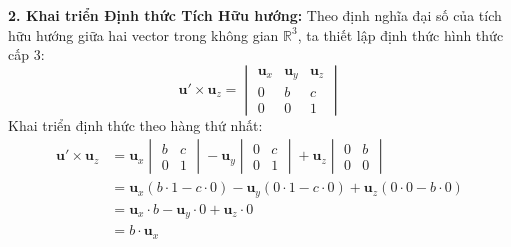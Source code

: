 \textbf{2. Khai triển Định thức Tích Hữu hướng:}
Theo định nghĩa đại số của tích hữu hướng giữa hai vector trong không gian $\mathbb{R}^3$, ta thiết lập định thức hình thức cấp 3:
\begin{equation}
\label{eq:cross_product_determinant}
\mathbf{u}' \times \mathbf{u}_z = \begin{vmatrix} \mathbf{u}_x & \mathbf{u}_y & \mathbf{u}_z \\ 0 & b & c \\ 0 & 0 & 1 \end{vmatrix}
\end{equation}
Khai triển định thức theo hàng thứ nhất:
\begin{align}
\mathbf{u}' \times \mathbf{u}_z &= \mathbf{u}_x \begin{vmatrix} b & c \\ 0 & 1 \end{vmatrix} - \mathbf{u}_y \begin{vmatrix} 0 & c \\ 0 & 1 \end{vmatrix} + \mathbf{u}_z \begin{vmatrix} 0 & b \\ 0 & 0 \end{vmatrix} \nonumber \\
&= \mathbf{u}_x (b \cdot 1 - c \cdot 0) - \mathbf{u}_y (0 \cdot 1 - c \cdot 0) + \mathbf{u}_z (0 \cdot 0 - b \cdot 0) \nonumber \\
&= \mathbf{u}_x \cdot b - \mathbf{u}_y \cdot 0 + \mathbf{u}_z \cdot 0 \nonumber \\
&= b \cdot \mathbf{u}_x
\end{align}

